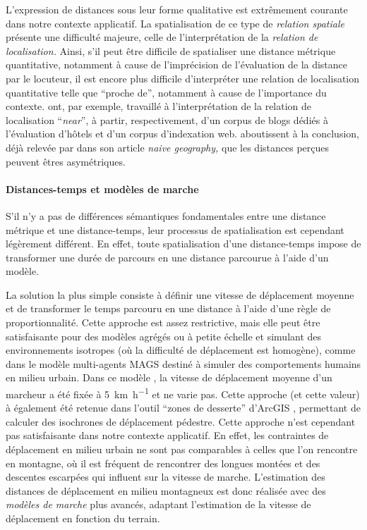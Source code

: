 L'expression de distances sous leur forme qualitative est extrêmement
courante dans notre contexte applicatif. La spatialisation de ce type
de \emph{relation spatiale} présente une difficulté majeure, celle de
l'interprétation de la \emph{relation de localisation.} Ainsi, s'il
peut être difficile de spatialiser une distance métrique quantitative,
notamment à cause de l'imprécision de l'évaluation de la distance par
le locuteur, il est encore plus difficile d’interpréter une relation
de localisation quantitative telle que \enquote{proche de}, notamment
à cause de l'importance du
contexte. \textcite{Wallgrun2004,Derungs2016} ont, par exemple,
travaillé à l'interprétation de la relation de localisation
\foreignquote{english}{\emph{near}}, à partir, respectivement, d'un
corpus de blogs dédiés à l'évaluation d'hôtels et d'un corpus
d'indexation web. \textcite{Wallgrun2004} aboutissent à la conclusion,
déjà relevée par \textcite{Egenhofer1995} dans son article \emph{naive
  geography,} que les distances perçues peuvent êtres asymétriques.

\paragraph{Distances-temps et modèles de marche}


S'il n'y a pas de différences sémantiques fondamentales entre une
distance métrique et une distance-temps, leur processus de
spatialisation est cependant légèrement différent. En effet, toute
spatialisation d'une distance-temps impose de transformer une durée de
parcours en une distance parcourue à l'aide d'un modèle.

La solution la plus simple consiste à définir une vitesse de
déplacement moyenne et de transformer le temps parcouru en une
distance à l'aide d'une règle de proportionnalité. Cette approche est
assez restrictive, mais elle peut être satisfaisante pour des modèles
agrégés ou à petite échelle et simulant des environnements isotropes
(où la difficulté de déplacement est homogène), comme dans le modèle
multi-agents MAGS \autocite{Moulin2003} destiné à simuler des
comportements humains en milieu urbain. Dans ce modèle
\autocite{Moulin2003}, la vitesse de déplacement moyenne d'un marcheur
a été fixée à \SI{5}{\kilo\meter\per\hour} et ne varie pas. Cette
approche (et cette valeur) à également été retenue dans l'outil
\enquote{zones de desserte} d'ArcGIS \autocite{ESRI2020}, permettant
de calculer des isochrones de déplacement pédestre. Cette approche
n'est cependant pas satisfaisante dans notre contexte applicatif. En
effet, les contraintes de déplacement en milieu urbain ne sont pas
comparables à celles que l'on rencontre en montagne, où il est
fréquent de rencontrer des longues montées et des descentes escarpées
qui influent sur la vitesse de marche. L'estimation des distances de
déplacement en milieu montagneux est donc réalisée avec des
\emph{modèles de marche} plus avancés, adaptant l'estimation de la
vitesse de déplacement en fonction du terrain.

